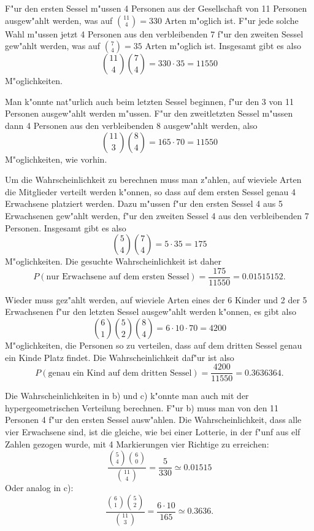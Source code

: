 \begin{loesung}
\begin{teilaufgaben}
\item F"ur den ersten Sessel m"ussen 4 Personen aus der Gesellschaft
von 11 Personen ausgew"ahlt werden, was auf $\binom{11}{4}=330$
Arten m"oglich ist. F"ur jede solche Wahl m"ussen jetzt 4 Personen
aus den verbleibenden 7 f"ur den zweiten Sessel gew"ahlt werden,
was auf $\binom{7}{4}=35$ Arten m"oglich ist. Insgesamt gibt es
also 
\[
\binom{11}{4}\binom{7}{4}=330\cdot 35=11550
\]
M"oglichkeiten.

Man k"onnte nat"urlich auch beim letzten Sessel beginnen, f"ur
den 3 von 11 Personen ausgew"ahlt werden m"ussen. F"ur den 
zweitletzten Sessel m"ussen dann 4 Personen aus den verbleibenden
8 ausgew"ahlt werden, also 
\[
\binom{11}{3}\binom{8}{4}=165\cdot 70=11550
\]
M"oglichkeiten, wie vorhin.
\item
Um die Wahrscheinlichkeit zu berechnen muss man z"ahlen, auf
wieviele Arten die Mitglieder verteilt werden k"onnen, so dass
auf dem ersten Sessel genau 4 Erwachsene platziert werden.
Dazu m"ussen f"ur den ersten Sessel 4 aus 5 Erwachsenen gew"ahlt werden,
f"ur den zweiten Sessel 4 aus den verbleibenden 7 Personen. Insgesamt
gibt es also
\[
\binom{5}{4}\binom{7}{4}=5\cdot 35=175
\]
M"oglichkeiten. Die gesuchte Wahrscheinlichkeit ist daher
\[
P(\text{nur Erwachsene auf dem ersten Sessel})=
\frac{175}{11550}=0.01515152.
\]
\item
Wieder muss gez"ahlt werden, auf wieviele Arten eines der 6 Kinder
und 2 der 5 Erwachsenen 
f"ur
den letzten Sessel ausgew"ahlt werden k"onnen, es gibt also
\[
\binom{6}{1}\binom{5}{2}\binom{8}{4}=6\cdot 10\cdot70=4200
\]
M"oglichkeiten, die Personen so zu verteilen, dass auf dem dritten
Sessel genau ein Kinde Platz findet. Die Wahrscheinlichkeit daf"ur ist
also
\[
P(\text{genau ein Kind auf dem dritten Sessel})=\frac{4200}{11550}=0.3636364.
\]
\end{teilaufgaben}
Die Wahrscheinlichkeiten in b) und c) k"onnte man auch mit der
hypergeometrischen Verteilung berechnen. F"ur b) muss man von
den 11 Personen 4 f"ur den ersten Sessel ausw"ahlen.
Die Wahrscheinlichkeit,
dass alle vier Erwachsene sind, ist
die gleiche, wie bei einer Lotterie, in der f"unf aus elf Zahlen gezogen wurde,
mit 4 Markierungen vier Richtige zu erreichen:
\[
\frac{
\binom{5}{4}\binom{6}{0}
}{
\binom{11}{4}
}
=\frac{5}{330}\simeq 0.01515
\]
Oder analog in c):
\[
\frac{
\binom{6}{1}\binom{5}{2}
}{
\binom{11}{3}
}
=\frac{6\cdot 10}{165}\simeq 0.3636.
\]
\end{loesung}
